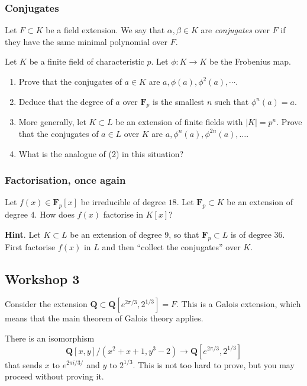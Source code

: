 \documentclass[11pt]{article}
\begin{document}
\subsubsection{Conjugates}
\label{sec:org1aeb3b2}

Let \(F \subset K\) be a field extension.
We say that \(\alpha, \beta \in K\) are \emph{conjugates} over \(F\) if they have the same minimal polynomial over \(F\).

Let \(K\) be a finite field of characteristic \(p\).
Let \(\phi \colon K \to K\) be the Frobenius map.
\begin{enumerate}
\item Prove that the conjugates of \(a \in K\) are \(a, \phi(a), \phi^2(a), \cdots\).
\item Deduce that the degree of \(a\) over \(\mathbf{F}_p\) is the smallest \(n\) such that \(\phi^n(a) = a\).
\item More generally, let \(K \subset L\) be an extension of finite fields with \(|K| = p^n\).
Prove that the conjugates of \(a \in L\) over \(K\) are \(a, \phi^n(a), \phi^{2n}(a), \dots\).
\item What is the analogue of (2) in this situation?
\end{enumerate}
\subsubsection{Factorisation, once again}
\label{sec:org0691cab}

Let \(f(x) \in \mathbf{F}_p[x]\) be irreducible of degree \(18\).
Let \(\mathbf{F}_p \subset K\) be an extension of degree \(4\).
How does \(f(x)\) factorise in \(K[x]\)?

\noindent
\textbf{Hint}.  Let \(K \subset L\) be an extension of degree 9, so that \(\mathbf{F}_p \subset L\) is of degree 36.  First factorise \(f(x)\) in \(L\) and then ``collect the conjugates'' over \(K\).
\subsection{Workshop 3}
\label{sec:org2412afe}
Consider the extension \(\mathbf{Q} \subset \mathbf{Q}[e^{2\pi/3}, 2^{1/3}] = F\).
This is a Galois extension, which means that the main theorem of Galois theory applies.

There is an isomorphism
\[ \mathbf{Q}[x,y]/(x^2+x+1, y^3-2) \to \mathbf{Q}[e^{2\pi/3}, 2^{1/3}]\]
that sends \(x\) to \(e^{2\pi i /3/}\) and \(y\) to \(2^{1/3}\).
This is not too hard to prove, but you may proceed without proving it.
\end{document}
